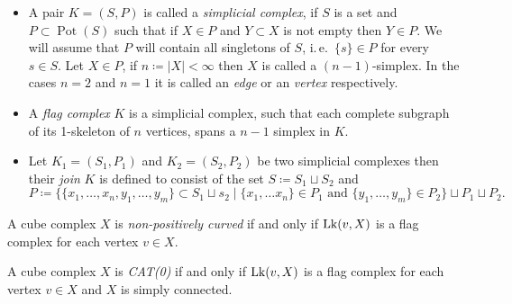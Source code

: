 \begin{defin}
  \begin{itemize}
  \item A pair \(K = (S, P)\) is called a \emph{simplicial complex}, if \(S\) is a set and \(P \subset \operatorname{Pot}(S)\) such that if \(X \in P\) and \(Y \subset X\) is not empty then \(Y \in P\). We will assume that \(P\) will contain all singletons of \(S\), i.\,e.\ \(\{s\} \in P\) for every \(s \in S\). Let \(X \in P\), if \(n \coloneqq |X| < \infty\) then \(X\) is called a \((n-1)\)-simplex. In the cases \(n=2\) and \(n=1\) it is called an \emph{edge} or an \emph{vertex} respectively.
  \item A \emph{flag complex} \(K\) is a simplicial complex, such that each complete subgraph of its 1-skeleton of \(n\) vertices, spans a \(n-1\) simplex in \(K\).
  \item Let \(K_1 = (S_1, P_1)\) and \(K_2 = (S_2, P_2)\) be two simplicial complexes then their \emph{join} \(K\) is defined to consist of the set \(S \coloneqq S_1 \sqcup S_2\) and
    \[
      P \coloneqq \{\{x_1, \dots, x_n, y_1, \dots, y_m\} \subset S_1 \sqcup s_2 \mid \{x_1, \dots x_n\} \in P_1 \text{ and } \{y_1, \dots, y_m\} \in P_2\} \sqcup P_1 \sqcup P_2.
    \]
  \end{itemize}
\end{defin}

\begin{thm}
  \label{thm:link}
  A cube complex \(X\) is \emph{non-positively curved} if and only if \(\operatorname{Lk}(v,X)\) is a flag complex for each vertex \(v \in X\).

  A cube complex \(X\) is \emph{CAT(0)} if and only if \(\operatorname{Lk}(v,X)\)  is a flag complex for each vertex \(v \in X\) and \(X\) is simply connected.
\end{thm}

